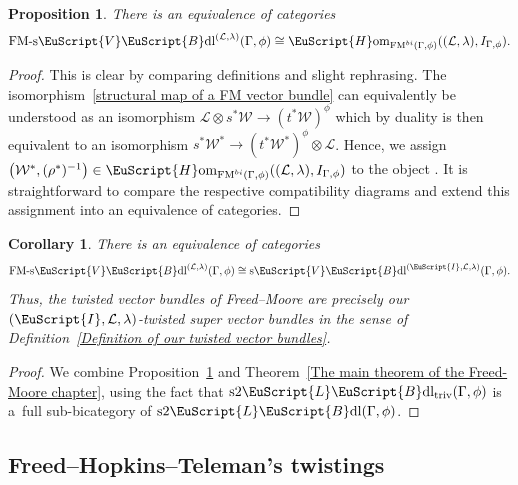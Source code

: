 \documentclass[10pt,a4paper]{amsart}
\numberwithin{equation}{section}
\newtheorem{Corollary}[Theorem]{Corollary}
\newtheorem{Proposition}[Theorem]{Proposition}
 { \theoremstyle{definition}
\newtheorem{Definition}[Theorem]{Definition}
\newtheorem{Example}[Theorem]{Example}
\newtheorem{Remark}[Theorem]{Remark} }
\def\mathscr#1{\EuScript{#1}}
\newcommand{\Hom}{\mathscr{H}\mathrm{om}}
\newcommand{\VectBdl}{\mathscr{V}\mathscr{B}\mathrm{dl}}
\newcommand{\LineBdl}{\mathscr{L}\mathscr{B}\mathrm{dl}}
\newcommand{\sVectBdl}{\mathrm{s}\VectBdl}
\newcommand{\stwoLineBdl}{\mathrm{s}2\LineBdl}
\newcommand{\stwoLineBdltriv}{\mathrm{s}2\LineBdl_{\mathrm{triv}}}
\begin{document}
\begin{Proposition} \label{Freed-Moore twisted vector bundles}
 There is an equivalence of categories
 \[
 \mathrm{FM}\text{-}\sVectBdl^{(\mathcal{L},\lambda)}(\Gamma,\phi) \cong \Hom_{\mathrm{FM}^{bi}(\Gamma,\phi)}((\mathcal{L},\lambda),I_{\Gamma,\phi}).
 \]
\end{Proposition}
\begin{proof}
 This is clear by comparing definitions and slight rephrasing.
 The isomorphism~\eqref{structural map of a FM vector bundle} can equivalently be understood
 as an isomorphism
$
 \mathcal{L} \otimes s^{*}\mathcal{W} \to (t^{*}\mathcal{W})^{\phi}
$
 which by duality is then equivalent to an isomorphism
$
 s^{*}\mathcal{W}^* \to (t^{*}\mathcal{W}^*)^{\phi} \otimes \mathcal{L}$.
 Hence, we assign $\bigl(\mathcal{W}^*,(\rho^*)^{-1}\bigr) \in \Hom_{\mathrm{FM}^{bi}(\Gamma,\phi)}((\mathcal{L},\lambda),I_{\Gamma,\phi})$
 to the object \smash{$(\mathcal{W},\rho) \in \mathrm{FM}\text{-}\sVectBdl^{(\mathcal{L},\lambda)}(\Gamma,\phi)$}. It is straightforward to compare the respective compatibility diagrams and
 extend this assignment into an equivalence of categories.
\end{proof}

\begin{Corollary}
\label{twisted-super-vector-bundles-FM}
There is an equivalence of categories
\begin{equation*}
\mathrm{FM}\text{-}\sVectBdl^{(\mathcal{L},\lambda)}(\Gamma,\phi) \cong \sVectBdl^{(\mathscr{I},\mathcal{L},\lambda)}(\Gamma,\phi) .
\end{equation*}
Thus, the twisted vector bundles of Freed--Moore are precisely our $(\mathscr{I},\mathcal{L},\lambda)$-twisted super vector bundles in the sense of Definition~{\rm\ref{Definition of our twisted vector bundles}}.
\end{Corollary}

\begin{proof}
We combine Proposition~\ref{Freed-Moore twisted vector bundles} and Theorem~\ref{The main theorem of the Freed-Moore chapter}, using the fact that $\stwoLineBdltriv(\Gamma,\phi)$ is a~full sub-bicategory of $\stwoLineBdl(\Gamma,\phi)$.
\end{proof}

\subsection{Freed--Hopkins--Teleman's twistings}
\label{Freed--Hopkins--Teleman-twistings}
\end{document}
